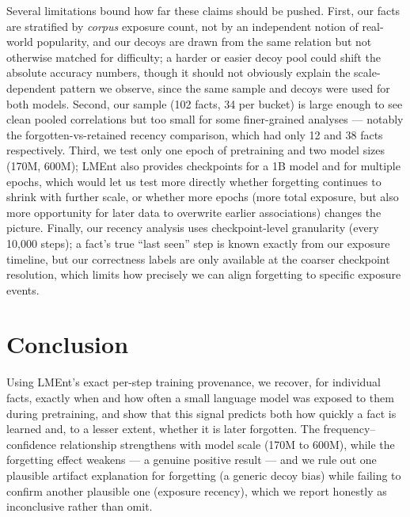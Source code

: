 \documentclass[11pt]{article}
\begin{document}
Several limitations bound how far these claims should be pushed. First, our facts are stratified by \emph{corpus} exposure count, not by an independent notion of real-world popularity, and our decoys are drawn from the same relation but not otherwise matched for difficulty; a harder or easier decoy pool could shift the absolute accuracy numbers, though it should not obviously explain the scale-dependent pattern we observe, since the same sample and decoys were used for both models. Second, our sample (102 facts, 34 per bucket) is large enough to see clean pooled correlations but too small for some finer-grained analyses --- notably the forgotten-vs-retained recency comparison, which had only 12 and 38 facts respectively. Third, we test only one epoch of pretraining and two model sizes (170M, 600M); LMEnt also provides checkpoints for a 1B model and for multiple epochs, which would let us test more directly whether forgetting continues to shrink with further scale, or whether more epochs (more total exposure, but also more opportunity for later data to overwrite earlier associations) changes the picture. Finally, our recency analysis uses checkpoint-level granularity (every 10{,}000 steps); a fact's true ``last seen'' step is known exactly from our exposure timeline, but our correctness labels are only available at the coarser checkpoint resolution, which limits how precisely we can align forgetting to specific exposure events.

\section{Conclusion}
Using LMEnt's exact per-step training provenance, we recover, for individual facts, exactly when and how often a small language model was exposed to them during pretraining, and show that this signal predicts both how quickly a fact is learned and, to a lesser extent, whether it is later forgotten. The frequency--confidence relationship strengthens with model scale (170M to 600M), while the forgetting effect weakens --- a genuine positive result --- and we rule out one plausible artifact explanation for forgetting (a generic decoy bias) while failing to confirm another plausible one (exposure recency), which we report honestly as inconclusive rather than omit.
\end{document}
